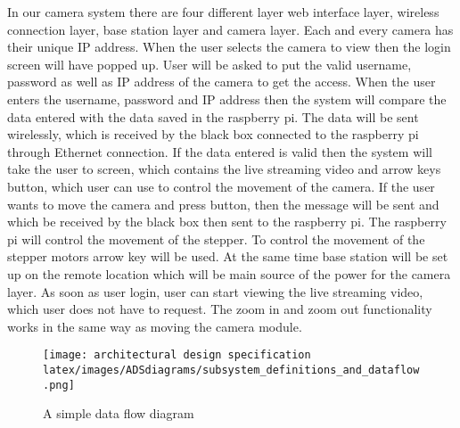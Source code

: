 In our camera system there are four different layer web interface layer, wireless connection layer, base station layer and camera layer. Each and every camera has their unique IP address. When the user selects the camera to view then the login screen will have popped up. User will be asked to put the valid username, password as well as IP address of the camera to get the access. When the user enters the username, password and IP address then the system will compare the data entered with the data saved in the raspberry pi. The data will be sent wirelessly, which is received by the black box connected to the raspberry pi through Ethernet connection. If the data entered is valid then the system will take the user to screen, which contains the live streaming video and arrow keys button, which user can use to control the movement of the camera. If the user wants to move the camera and press button, then the message will be sent and which be received by the black box then sent to the raspberry pi. The raspberry pi will control the movement of the stepper. To control the movement of the stepper motors arrow key will be used. At the same time base station will be set up on the remote location which will be main source of the power for the camera layer. As soon as user login, user can start viewing the live streaming video, which user does not have to request. The zoom in and zoom out functionality works in the same way as moving the camera module.


\begin{figure}[h!]
	\centering
 	\texttt{[image: architectural design specification latex/images/ADSdiagrams/subsystem\_definitions\_and\_dataflow.png]}
 \caption{A simple data flow diagram}
\end{figure}
